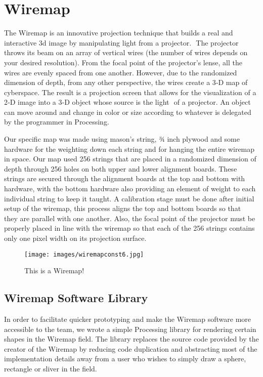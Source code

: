 \section{Wiremap}
The Wiremap is an innovative projection technique that builds a real and interactive 3d image by manipulating light from a projector.  The projector throws its beam on an array of vertical wires (the number of wires depends on your desired resolution). From the focal point of the projector’s lense, all the wires are evenly spaced from one another. However, due to the randomized dimension of depth, from any other perspective, the wires create a 3‐D map of cyberspace. The result is a projection screen that allows for the visualization of a 2‐D image into a 3‐D object whose source is the light  of a projector. An object can move around and change in color or size according to whatever is delegated by the programmer in Processing.   

Our specific map was made using mason’s string, 3⁄4 inch plywood and some hardware for the weighting down each string and for hanging the entire wiremap in space. Our map used 256 strings that are placed in a randomized dimension of depth through 256 holes on both upper and lower alignment boards. These strings are secured through the alignment boards at the top and bottom with hardware, with the bottom hardware also providing an element of weight to each individual string to keep it taught. A calibration stage must be done after initial setup of the wiremap, this process aligns the top and bottom boards so that they are parallel with one another. Also, the focal point of the projector must be properly placed in line with the wiremap so that each of the 256 strings contains only one pixel width on its projection surface. 

\begin{figure}[htp]\centering
  \texttt{[image: images/wiremapconst6.jpg]}
  \caption{This is a Wiremap!}\label{fig:wmdiagram}
\end{figure}
\subsection{Wiremap Software Library}
In order to facilitate quicker prototyping and make the Wiremap software more accessible to the team, we wrote a simple Processing library for rendering certain shapes in the Wiremap field. The library replaces the source code provided by the creator of the Wiremap \cite{AH} by reducing code duplication and abstracting most of the implementation details away from a user who wishes to simply draw a sphere, rectangle or sliver in the field.


